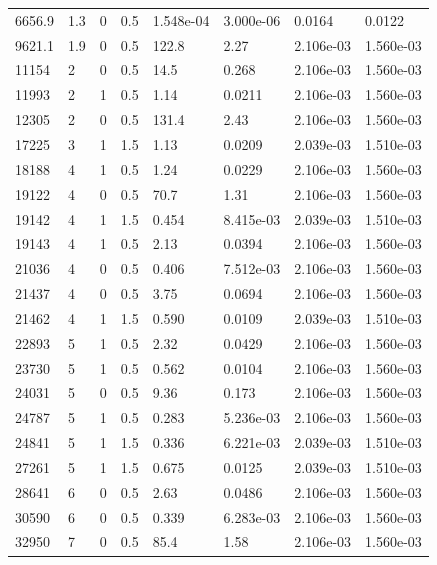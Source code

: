 \documentclass[preview]{standalone}
\begin{document}
{{\begin{tabular}{L{1.2cm}C{1.2cm} C{0.3cm}C{0.5cm} C{1.4cm}C{1.4cm} C{1.4cm}C{1.4cm}}
  6656.9  &   1.3  & 0     & 0.5 &  1.548e-04  & 3.000e-06  & 0.0164 &  0.0122   \\ 
  9621.1  &   1.9  & 0     & 0.5 &  122.8  & 2.27  & 2.106e-03 &  1.560e-03   \\ 
  11154  &     2  & 0     & 0.5 &  14.5  & 0.268  & 2.106e-03 &  1.560e-03   \\ 
  11993  &     2  & 1     & 0.5 &  1.14  & 0.0211  & 2.106e-03 &  1.560e-03   \\ 
  12305  &     2  & 0     & 0.5 &  131.4  & 2.43  & 2.106e-03 &  1.560e-03   \\ 
  17225  &     3  & 1     & 1.5 &  1.13  & 0.0209  & 2.039e-03 &  1.510e-03   \\ 
  18188  &     4  & 1     & 0.5 &  1.24  & 0.0229  & 2.106e-03 &  1.560e-03   \\ 
  19122  &     4  & 0     & 0.5 &  70.7  & 1.31  & 2.106e-03 &  1.560e-03   \\ 
  19142  &     4  & 1     & 1.5 &  0.454  & 8.415e-03  & 2.039e-03 &  1.510e-03   \\ 
  19143  &     4  & 1     & 0.5 &  2.13  & 0.0394  & 2.106e-03 &  1.560e-03   \\ 
  21036  &     4  & 0     & 0.5 &  0.406  & 7.512e-03  & 2.106e-03 &  1.560e-03   \\ 
  21437  &     4  & 0     & 0.5 &  3.75  & 0.0694  & 2.106e-03 &  1.560e-03   \\ 
  21462  &     4  & 1     & 1.5 &  0.590  & 0.0109  & 2.039e-03 &  1.510e-03   \\ 
  22893  &     5  & 1     & 0.5 &  2.32  & 0.0429  & 2.106e-03 &  1.560e-03   \\ 
  23730  &     5  & 1     & 0.5 &  0.562  & 0.0104  & 2.106e-03 &  1.560e-03   \\ 
  24031  &     5  & 0     & 0.5 &  9.36  & 0.173  & 2.106e-03 &  1.560e-03   \\ 
  24787  &     5  & 1     & 0.5 &  0.283  & 5.236e-03  & 2.106e-03 &  1.560e-03   \\ 
  24841  &     5  & 1     & 1.5 &  0.336  & 6.221e-03  & 2.039e-03 &  1.510e-03   \\ 
  27261  &     5  & 1     & 1.5 &  0.675  & 0.0125  & 2.039e-03 &  1.510e-03   \\ 
  28641  &     6  & 0     & 0.5 &  2.63  & 0.0486  & 2.106e-03 &  1.560e-03   \\ 
  30590  &     6  & 0     & 0.5 &  0.339  & 6.283e-03  & 2.106e-03 &  1.560e-03   \\ 
  32950  &     7  & 0     & 0.5 &  85.4  & 1.58  & 2.106e-03 &  1.560e-03   \\ 

\end{tabular}}}
\end{document}
